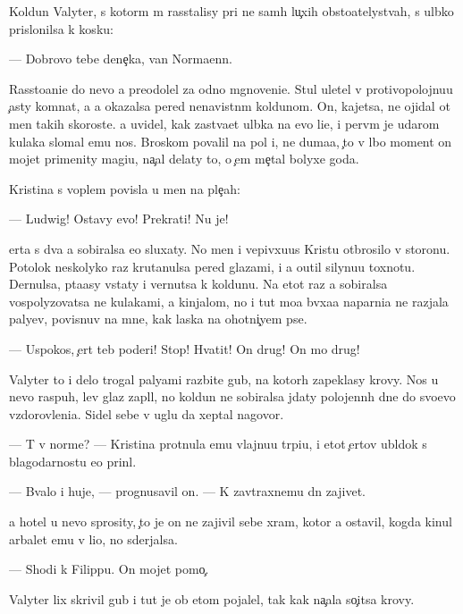 \documentclass[10pt]{book}
\begin{document}
Koldun Valyter, s kotor{\yi}m m{\yi} rasstalisy pri ne sam{\yi}h lu{\c}xih obsto{\y}atelystvah, s ul{\yi}bko{\y} prislonilsa k kos{\ia}ku:

— Dobrovo tebe dene{\c}ka, van Norma{\y}enn.

Rassto{\y}ani{\y}e do nevo {\y}a preodolel za odno mgnoveni{\y}e. Stul uletel v protivopolojnu{\y}u {\c}asty komnat{\yi}, a {\y}a okazalsa pered nenavistn{\yi}m koldunom. On, kajetsa, ne ojidal ot men{\ia} takih skoroste{\y}. {\Y}a uvidel, kak zast{\yi}va{\y}et ul{\yi}bka na {\y}evo li{\q}e, i perv{\yi}m je udarom kulaka slomal {\y}emu nos. Broskom povalil na pol i, ne duma{\y}a, {\c}to v l{\iu}bo{\y} moment on mojet primenity magi{\y}u, na{\c}al delaty to, o {\c}em me{\c}tal bolyxe goda.

Kristina s voplem povisla u men{\ia} na ple{\c}ah:

— Ludwig! Ostavy {\y}evo! Prekrati! Nu je!

{\C}erta s dva {\y}a sobiralsa {\y}e{\y}o sluxaty. No men{\ia} i v{\q}epivxu{\y}us{\ia} Kristu otbrosilo v storonu. Potolok neskolyko raz krutanulsa pered glazami, i {\y}a o{\x}util silynu{\y}u toxnotu. Dernulsa, p{\yi}ta{\y}asy vstaty i vernutsa k koldunu. Na etot raz {\y}a sobiralsa vospolyzovatsa ne kulakami, a kinjalom, no i tut mo{\y}a b{\yi}vxa{\y}a naparni{\q}a ne razjala paly{\q}ev, povisnuv na mne, kak laska na ohotni{\c}yem pse.

— Uspoko{\y}s{\ia}, {\c}ert teb{\ia} poderi! Stop! Hvatit! On drug! On mo{\y} drug!



Valyter to i delo trogal paly{\q}ami razbit{\yi}{\y}e gub{\yi}, na kotor{\yi}h zapeklasy krovy. Nos u nevo raspuh, lev{\yi}{\y} glaz zapl{\yi}l, no koldun ne sobiralsa jdaty polojenn{\yi}h dne{\y} do svo{\y}evo v{\yi}zdorovleni{\y}a. Sidel sebe v uglu da xeptal nagovor{\yi}.

— T{\yi} v norme? — Kristina prot{\ia}nula {\y}emu vlajnu{\y}u tr{\ia}pi{\q}u, i etot {\c}ertov ubl{\iu}dok s blagodarnost{\y}u {\y}e{\y}o prin{\ia}l.

— B{\yi}valo i huje, — prognusavil on. — K zavtraxnemu dn{\iu} zajivet.

{\Y}a hotel u nevo sprosity, {\c}to je on ne zajivil sebe xram, kotor{\yi}{\y} {\y}a ostavil, kogda kinul arbalet {\y}emu v li{\q}o, no sderjalsa.

— Shodi k Filippu. On mojet pomo{\c}.

Valyter lix skrivil gub{\yi} i tut je ob etom pojalel, tak kak na{\c}ala so{\c}itsa krovy.
\end{document}
